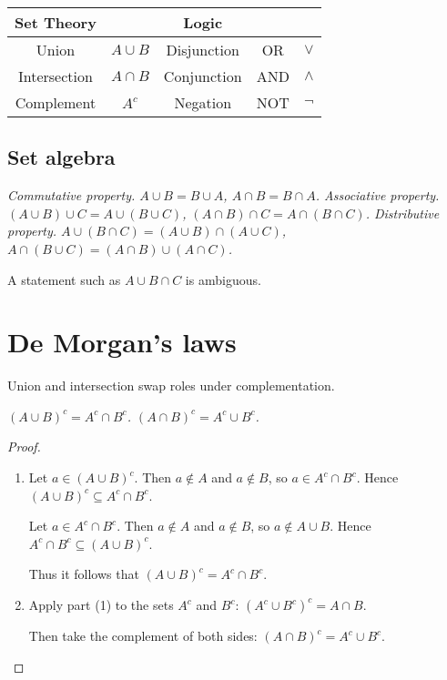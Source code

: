 \begin{center}
\begin{tabular}{|c|c||c|c|c|} \hline
Set Theory 		& 			& Logic			&		& \\ \hline
Union			& $A\cup B$	& Disjunction 	& OR 	& $\lor$	\\
Intersection		& $A\cap B$	& Conjunction	& AND 	& $\land$\\
Complement		& $A^c$		& Negation		& NOT 	& $\lnot$	\\ \hline
\end{tabular}
\end{center}

\break %

\subsection{Set algebra}
\begin{definition}
\ben
\it Commutative property.
\bit 
\it $A\cup B = B\cup A$,
\it $A\cap B = B\cap A$.
\eit
\it Associative property.
\bit 
\it $(A\cup B)\cup C = A\cup (B\cup C)$,
\it $(A\cap B)\cap C = A\cap (B\cap C)$.
\eit
\it Distributive property.
\bit 
\it $A\cup (B\cap C) = (A\cup B)\cap(A\cup C)$,
\it $A\cap (B\cup C) = (A\cap B)\cup(A\cap C)$.
\eit
\een
\end{definition}

\begin{remark}
A statement such as $A\cup B\cap C$ is ambiguous. 
\end{remark}

\section{De Morgan's laws}
Union and intersection swap roles under complementation.

\begin{theorem}\label{thm:demorgan_simple}
\ben
\it $(A\cup B)^c = A^c\cap B^c$.
\it $(A\cap B)^c = A^c\cup B^c$.
\een
\end{theorem}

\begin{proof}
\begin{enumerate}
\item %
Let $a\in(A\cup B)^c$. Then $a\notin A$ and $a\notin B$, so $a\in A^c\cap B^c$.
Hence $(A\cup B)^c\subseteq A^c\cap B^c$.\par
Let $a\in A^c\cap B^c$. Then $a\notin A$ and $a\notin B$, so $a\notin A\cup B$.
Hence $A^c\cap B^c\subseteq (A\cup B)^c$.\par
Thus it follows that $(A\cup B)^c = A^c\cap B^c$.
\item %
Apply part (1) to the sets $A^c$ and $B^c$: $(A^c\cup B^c)^c = A\cap B$.\par
Then take the complement of both sides: $(A\cap B)^c = A^c\cup B^c$.
\end{enumerate}
\end{proof}

